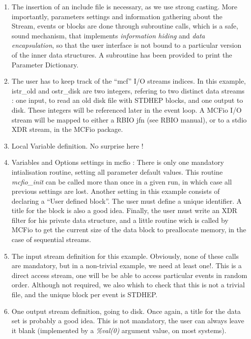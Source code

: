 \begin{enumerate}
\item The insertion of an include file is necessary, as we use strong  casting.
More importantly,  parameters settings and information gathering about
the Stream, events or blocks  are done through subroutine calls, 
which is a safe, sound mechanism, that implements {\em information hiding}
and {\em data encapsulation}, so that the user interface is not 
bound to a particular version of the inner data structures. A subroutine 
has been provided to print the Parameter Dictionary. 

\item  The user has to keep track of the ``mcf'' I/O streams indices. In this 
example,  istr\_old and ostr\_disk are two integers, refering to two distinct
data streams : one input, to read an old  disk file with STDHEP blocks, and one
output to disk.  These integers will be referenced  later in the event loop.  
A MCFio I/O stream will be mapped to either a RBIO jfn (see RBIO 
manual),  or to a stdio XDR stream, in the MCFio package.

\item Local Variable definition. No surprise here !

\item  Variables and Options settings in mcfio : There is only one  mandatory
intialisation routine, setting all parameter default values. This routine {\em
mcfio\_init} can be called more than once in a given  run, in which case all
previous settings are lost. Another setting in this example consists of
declaring a  ``User defined block''. The user must define a unique identifier. A
title for the block is also a  good idea. Finally, the user must write an XDR
filter for  his private data structure, and a little routine wich is 
called by MCFio to get the current size of the data block to preallocate
memory, in the case of sequential streams.  

\item The input stream definition for this example. Obviously, none of these 
calls are mandatory, but in a non-trivial example, we need  at least one!. This
is a direct access stream, one will be  be able to access particular  events in
random order. Although not required, we also whish to check that this is  not a
trivial file, and the unique block per event is STDHEP.

\item One output stream definition, going to disk. Once again, a title for the
data set is probably a good idea. This is not mandatory, the user can always
leave it blank (implemented by a {\em \%val(0)} argument value, on most
systems). 
		
\end{enumerate}

